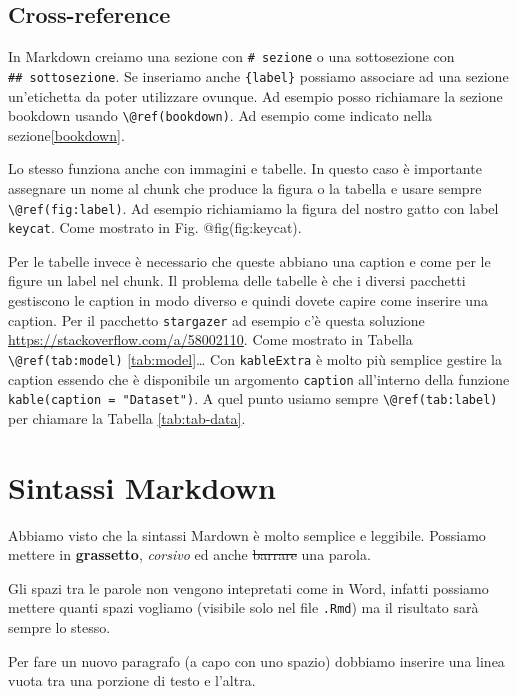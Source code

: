 \documentclass[
]{article}
\begin{document}
\hypertarget{cross-reference}{%
\subsection{Cross-reference}\label{cross-reference}}

In Markdown creiamo una sezione con \texttt{\#\ sezione} o una sottosezione con \texttt{\#\#\ sottosezione}. Se inseriamo anche \texttt{\{label\}} possiamo associare ad una sezione un'etichetta da poter utilizzare ovunque. Ad esempio posso richiamare la sezione bookdown usando \texttt{\textbackslash{}@ref(bookdown)}. Ad esempio come indicato nella sezione\ref{bookdown}.

Lo stesso funziona anche con immagini e tabelle. In questo caso è importante assegnare un nome al chunk che produce la figura o la tabella e usare sempre \texttt{\textbackslash{}@ref(fig:label)}. Ad esempio richiamiamo la figura del nostro gatto con label \texttt{keycat}. Come mostrato in Fig. @fig(fig:keycat).

Per le tabelle invece è necessario che queste abbiano una caption e come per le figure un label nel chunk. Il problema delle tabelle è che i diversi pacchetti gestiscono le caption in modo diverso e quindi dovete capire come inserire una caption. Per il pacchetto \texttt{stargazer} ad esempio c'è questa soluzione \url{https://stackoverflow.com/a/58002110}.
Come mostrato in Tabella \texttt{\textbackslash{}@ref(tab:model)} \ref{tab:model}\ldots{}
Con \texttt{kableExtra} è molto più semplice gestire la caption essendo che è disponibile un argomento \texttt{caption} all'interno della funzione \texttt{kable(caption\ =\ "Dataset")}. A quel punto usiamo sempre \texttt{\textbackslash{}@ref(tab:label)} per chiamare la Tabella \ref{tab:tab-data}.

\hypertarget{sintassi-markdown}{%
\section{Sintassi Markdown}\label{sintassi-markdown}}

Abbiamo visto che la sintassi Mardown è molto semplice e leggibile. Possiamo mettere in \textbf{grassetto}, \emph{corsivo} ed anche \sout{barrare} una parola.

Gli spazi tra le parole non vengono intepretati come in Word, infatti possiamo mettere quanti spazi vogliamo (visibile solo nel file \texttt{.Rmd}) ma il risultato sarà sempre lo stesso.

Per fare un nuovo paragrafo (a capo con uno spazio) dobbiamo inserire una linea vuota tra una porzione di testo e l'altra.
\end{document}
